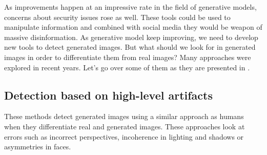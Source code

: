 \documentclass[12pt,a4paper]{article}
\begin{document}
As improvements happen at an impressive rate in the field of generative models, concerns about security issues rose as well. These tools could be used to manipulate information and combined with social media they would be weapon of massive disinformation. As generative model keep improving, we need to develop new tools to detect generated images. But what should we look for in generated images in order to differentiate them from real images? Many approaches were explored in recent years. Let's go over some of them as they are presented in \autocite*{tariangSyntheticImageVerification2024}.

\subsection{Detection based on high-level artifacts}
These methods detect generated images using a similar approach as humans when they differentiate real and generated images. These approaches look at errors such as incorrect perspectives, incoherence in lighting and shadows or asymmetries in faces.
\end{document}
